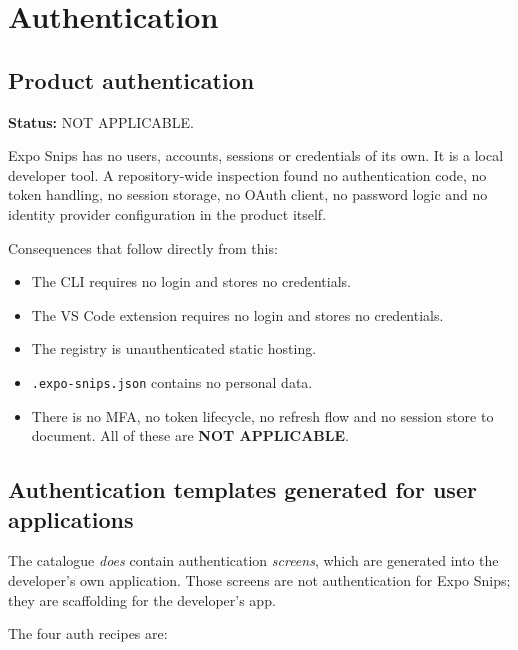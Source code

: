 \chapter{Authentication}
\label{ch:authentication}

\section{Product authentication}

\textbf{Status:} NOT APPLICABLE.

Expo Snips has no users, accounts, sessions or credentials of its own. It is a
local developer tool. A repository-wide inspection found no authentication code,
no token handling, no session storage, no OAuth client, no password logic and no
identity provider configuration in the product itself.

Consequences that follow directly from this:

\begin{itemize}
  \item The CLI requires no login and stores no credentials.
  \item The VS Code extension requires no login and stores no credentials.
  \item The registry is unauthenticated static hosting.
  \item \texttt{.expo-snips.json} contains no personal data.
  \item There is no MFA, no token lifecycle, no refresh flow and no session store
        to document. All of these are \textbf{NOT APPLICABLE}.
\end{itemize}

\section{Authentication templates generated for user applications}

The catalogue \emph{does} contain authentication \emph{screens}, which are
generated into the developer's own application. Those screens are not
authentication for Expo Snips; they are scaffolding for the developer's app.

The four auth recipes are:

